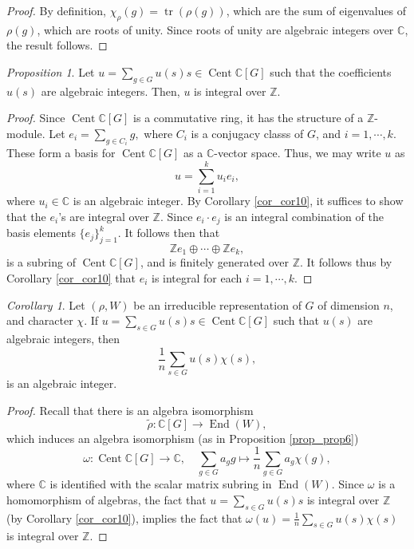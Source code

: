 \documentclass[a4paper]{report}
\theoremstyle{definition}
\theoremstyle{remark}
\theoremstyle{proposition}
\newtheorem{proposition}{Proposition}
\theoremstyle{conjecture}
\theoremstyle{lemma}
\theoremstyle{corollary}
\newtheorem{corollary}{Corollary}
\theoremstyle{exercise}
\theoremstyle{example}
\newcommand{\C}{\mathbb{C}}
\newcommand{\on}{\operatorname}
\begin{document}
\begin{proof}
    By definition, $\chi_\rho(g) = \on{tr}(\rho(g))$, which are
    the sum of eigenvalues of $\rho(g)$, which are roots of unity. 
    Since roots of unity are algebraic integers over $\C$, the result follows.
\end{proof}

\begin{proposition}
    Let $u =\sum_{g\in G} u(s)s \in \on{Cent}\C[G]$ such that 
    the coefficients $u(s)$ are algebraic integers. Then, 
    $u$ is integral over $\mathbb{Z}$.
\end{proposition}

\begin{proof}
    Since $\on{Cent}\C[G]$ is a commutative ring, it has the structure of 
    a $\mathbb{Z}$-module. Let $e_i = \sum_{g\in C_i}g,$ where $C_i$ is a 
    conjugacy classs of $G$, and $i=1,\cdots,k$. 
    These form a basis for $\on{Cent}\C[G]$ as a $\C$-vector space.
    Thus, we may write $u$ as 
    $$u = \sum_{i=1}^k u_i e_i,$$
    where $u_i\in\C$ is an algebraic integer.  
    By Corollary \ref{cor_cor10}, it suffices to show that the $e_i$'s are 
    integral over $\mathbb{Z}$. 
    Since $e_i\cdot e_j$ is an integral combination of the basis elements
    $\lbrace e_j\rbrace_{j=1}^k$.
    It follows then that 
    $$\mathbb{Z} e_1\oplus \cdots \oplus \mathbb{Z}e_k,$$
    is a subring of $\on{Cent}\C[G]$, and is finitely generated over 
    $\mathbb{Z}$. It follows thus by Corollary \ref{cor_cor10}
    that $e_i$ is integral for each $i=1,\cdots,k$.

\end{proof}

\begin{corollary}\label{cor_cor12}
    Let $(\rho,W)$ be an irreducible representation of $G$ of dimension $n$,
    and character $\chi$. If $u = \sum_{s \in G}u(s)s \in \on{Cent}\C[G]$
    such that $u(s)$ are algebraic integers, then 
    $$\frac{1}{n} \sum_{s \in G} u(s) \chi(s),$$
    is an algebraic integer.
\end{corollary}

\begin{proof}
    Recall that there is an algebra isomorphism
    $$\tilde{\rho} : \C[G] \longrightarrow \on{End}(W),$$
    which induces an algebra isomorphism (as in Proposition \ref{prop_prop6})
    $$\omega:\on{Cent}\C[G] \longrightarrow \C,\quad \sum_{g\in G} a_gg \longmapsto \frac{1}{n}\sum_{g\in G}a_g\chi(g),$$
    where $\C$ is identified with the scalar matrix subring in
    $\on{End}(W)$. 
    Since $\omega$ is a homomorphism of algebras, the fact that 
    $u = \sum_{s\in G}u(s)s$ is integral over $\mathbb{Z}$ (by Corollary 
    \ref{cor_cor10}), implies the fact that 
    $\omega(u) = \frac{1}{n}\sum_{s\in G} u(s)\chi(s)$ is integral over 
    $\mathbb{Z}$.

\end{proof}
\end{document}
